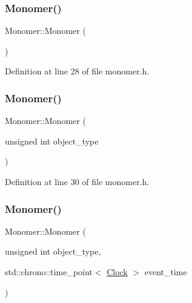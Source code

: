 \subsubsection{\texorpdfstring{Monomer()}{Monomer()}\hspace{0.1cm}{\footnotesize\ttfamily [1/4]}}
{\footnotesize\ttfamily Monomer\+::\+Monomer (\begin{DoxyParamCaption}{ }\end{DoxyParamCaption})\hspace{0.3cm}{\ttfamily [inline]}}



Definition at line 28 of file monomer.\+h.

\mbox{\label{class_monomer_af2249bf76132ee3802eaccb49b76fb96}} 
\subsubsection{\texorpdfstring{Monomer()}{Monomer()}\hspace{0.1cm}{\footnotesize\ttfamily [2/4]}}
{\footnotesize\ttfamily Monomer\+::\+Monomer (\begin{DoxyParamCaption}\item[{unsigned int}]{object\+\_\+type }\end{DoxyParamCaption})\hspace{0.3cm}{\ttfamily [inline]}}



Definition at line 30 of file monomer.\+h.

\mbox{\label{class_monomer_acab23e1c41e236417492da5c1e617b1a}} 
\subsubsection{\texorpdfstring{Monomer()}{Monomer()}\hspace{0.1cm}{\footnotesize\ttfamily [3/4]}}
{\footnotesize\ttfamily Monomer\+::\+Monomer (\begin{DoxyParamCaption}\item[{unsigned int}]{object\+\_\+type,  }\item[{std\+::chrono\+::time\+\_\+point$<$ \mbox{\hyperlink{universe_8h_a0ef8d951d1ca5ab3cfaf7ab4c7a6fd80}{Clock}} $>$}]{event\+\_\+time }\end{DoxyParamCaption})\hspace{0.3cm}{\ttfamily [inline]}}



